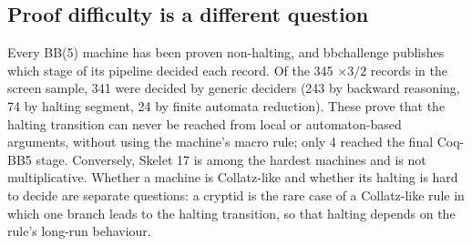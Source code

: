 \documentclass[11pt,a4paper]{article}
\newcommand{\BB}[1]{BB(#1)}
\begin{document}
\subsection{Proof difficulty is a different question}
Every \BB{5} machine has been proven non-halting, and bbchallenge publishes which stage of its
pipeline decided each record. Of the 345 $\times3/2$ records in the screen sample, 341 were decided
by generic deciders (243 by backward reasoning, 74 by halting segment, 24 by finite automata
reduction). These prove that the halting transition can never be reached from local or
automaton-based arguments, without using the machine's macro rule; only 4 reached the final
Coq-BB5 stage. Conversely, Skelet 17 is among the hardest
machines and is not multiplicative. Whether a machine is Collatz-like and whether its halting is
hard to decide are separate questions: a cryptid is the rare case of a Collatz-like rule in which
one branch leads to the halting transition, so that halting depends on the rule's long-run
behaviour.


\end{document}
